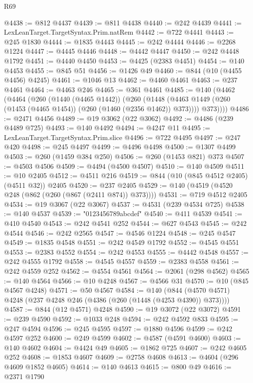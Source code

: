 \begin{lexlean}{R69}
\begin{coremodule}
{@4438 := @812 @4437
@4439 := @811 @4438
@4440 := @242 @4439
@4441 := LexLeanTarget.TargetSyntax.Prim.natRem
@4442 := @722 @4441
@4443 := @245 @1830
@4444 := @1835 @4443
@4445 := @242 @4444
@4446 := @2268 @1224
@4447 := @4445 @4446
@4448 := @4442 @4447
@4450 := @242 @4448 @1792
@4451 := @4440 @4450
@4453 := @4425 (@2383 @4451)
@4454 := @140 @4453
@4455 := @845 @51
@4456 := @1426 @49
@4460 := @844 (@10 (@4455 @4456) @4245)
@4461 := @1046 @13
@4462 := @4460 @4461
@4463 := @237 @4461
@4464 := @4463 @246
@4465 := @361 @4461
@4485 := @140
    (@4462
      (@4464
        (@260
          (@1440 (@4465 @1442))
          (@260
            (@1448 (@4463 @1449 (@260 (@1453 (@4465 @1454)) (@260 (@1460 (@2356 @1462)) @373))))
            @373))))
@4486 := @2471 @4456
@4489 := @19 @3062 (@22 @3062)
@4492 := @4486 (@239 @4489 @725)
@4493 := @140 @4492
@4494 := @4247 @11
@4495 := LexLeanTarget.TargetSyntax.Prim.slice
@4496 := @722 @4495
@4497 := @247 @420
@4498 := @245 @4497
@4499 := @4496 @4498
@4500 := @1307 @4499
@4503 := @260 (@1459 @384 @250)
@4506 := @260 (@1453 @821) @373
@4507 := @4503 @4506
@4509 := @4494 (@4500 @4507)
@4510 := @140 @4509
@4511 := @10 @2405
@4512 := @4511 @216
@4519 := @844 (@10 (@845 @4512 @2405) (@4511 @32)) @2405
@4520 := @237 @2405
@4529 := @140 (@4519 (@4520 @248 (@862 (@260 (@867 (@2411 @874)) @373))))
@4531 := @719 @4512 @2405
@4534 := @19 @3067 (@22 @3067)
@4537 := @4531 (@239 @4534 @725)
@4538 := @140 @4537
@4539 := "0123456789abcdef"
@4540 := @411 @4539
@4541 := @410 @4540
@4543 := @242 @4541 @252
@4544 := @627 @4543
@4545 := @242 @4544
@4546 := @242 @2565
@4547 := @4546 @1224
@4548 := @245 @4547
@4549 := @1835 @4548
@4551 := @242 @4549 @1792
@4552 := @4545 @4551
@4553 := @2383 @4552
@4554 := @242 @4553
@4555 := @4442 @4548
@4557 := @242 @4555 @1792
@4558 := @4545 @4557
@4559 := @2383 @4558
@4561 := @242 @4559 @252
@4562 := @4554 @4561
@4564 := @2061 (@298 @4562)
@4565 := @140 @4564
@4566 := @10 @4248
@4567 := @4566 @31
@4570 := @10 (@845 @4567 @4248)
@4571 := @50 @4567
@4584 := @140 (@844 (@4570 @4571) @4248 (@237 @4248 @246 (@4386 (@260 (@1448 (@4253 @4390)) @373))))
@4587 := @844 (@12 @4571) @4248
@4590 := @19 @3072 (@22 @3072)
@4591 := @239 @4590
@4592 := @1033 @248
@4594 := @242 @4592 @833
@4595 := @247 @4594
@4596 := @245 @4595
@4597 := @1880 @4596
@4599 := @242 @4597 @252
@4600 := @249 @4599
@4602 := @4587 (@4591 @4600)
@4603 := @140 @4602
@4604 := @4424 @49
@4605 := @1862 @725
@4607 := @242 @4605 @252
@4608 := @1853 @4607
@4609 := @2758 @4608
@4613 := @4604 (@296 @4609 @1852 @4605)
@4614 := @140 @4613
@4615 := @800 @49
@4616 := @2371 @1790
}
\end{coremodule}
\end{lexlean}
